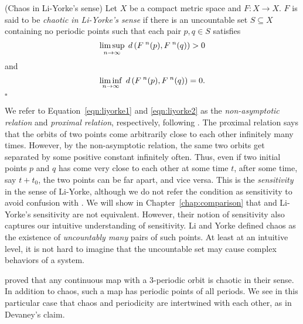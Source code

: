 \documentclass[10pt,draft,twoside]{book}
\begin{document}
\begin{definition}
  (Chaos in Li-Yorke's sense)
  Let $X$ be a compact metric space and $F: X\to X$.
  $F$ is said to be \textit{chaotic in Li-Yorke's sense} if there is an uncountable set $S \subseteq X$ containing no
  periodic points such that each pair $p,q \in S$ satisfies
  \begin{equation}
    \limsup\limits_{n \to \infty}\; d\left( F^{\;n}(p) , F^{\;n}(q) \right) > 0
    \label{eqn:liyorke1}
  \end{equation}
  and
  \begin{equation}
    \liminf\limits_{n \to \infty}\; d\left( F^{\;n}(p) , F^{\;n}(q) \right) = 0.
    \label{eqn:liyorke2}
  \end{equation}
  $\square$
\end{definition}
We refer to Equation~\eqref{eqn:liyorke1} and \eqref{eqn:liyorke2} as the \textit{non-asymptotic relation} and \textit{proximal relation}, respectively, following \citet{blanchard}.
The proximal relation says that the orbits of two points come arbitrarily close to each other infinitely many times.
However, by the non-asymptotic relation, the same two orbits get separated by some positive constant infinitely often.
Thus, even if two initial points $p$ and $q$ has come very close to each other at some time $t$, after some time, say $t + t_0$, the two points can be far apart, and vice versa.
This is the \textit{sensitivity} in the sense of Li-Yorke, although we do not refer the condition as sensitivity to avoid confusion with \sdic. 
We will show in Chapter~\ref{chap:comparison} that \sdic and Li-Yorke's sensitivity are not equivalent.
However, their notion of sensitivity also captures our intuitive understanding of sensitivity.
Li and Yorke defined chaos as the existence of \textit{uncountably many} pairs of such points.
At least at an intuitive level, it is not hard to imagine that the uncountable set may cause complex behaviors of a system.

\citet{li-yorke} proved that any continuous map with a 3-periodic orbit is chaotic in their sense.
In addition to chaos, such a map has periodic points of all periods.
We see in this particular case that chaos and periodicity are intertwined with each other, as in Devaney's claim.
\end{document}

